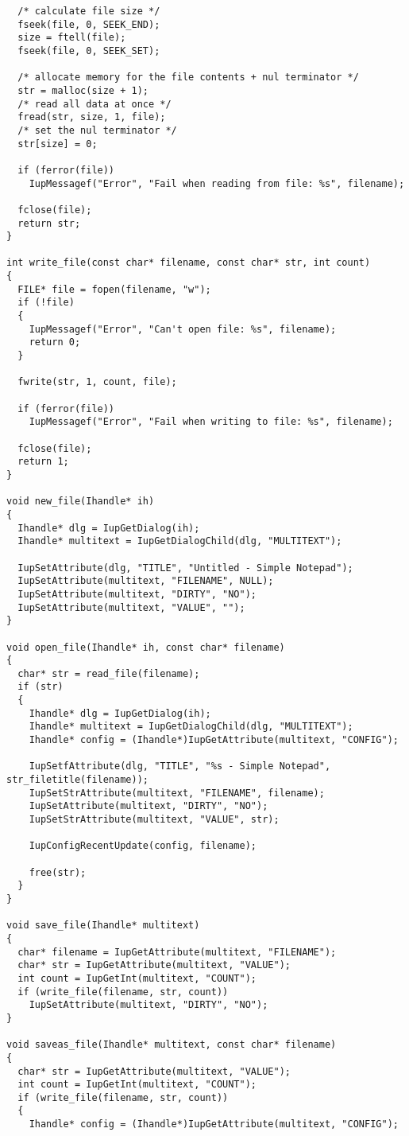 \documentclass{ctexart}
\begin{document}
\begin{lstlisting}
  /* calculate file size */
  fseek(file, 0, SEEK_END);
  size = ftell(file);
  fseek(file, 0, SEEK_SET);

  /* allocate memory for the file contents + nul terminator */
  str = malloc(size + 1);
  /* read all data at once */
  fread(str, size, 1, file);
  /* set the nul terminator */
  str[size] = 0;

  if (ferror(file))
    IupMessagef("Error", "Fail when reading from file: %s", filename);

  fclose(file);
  return str;
}

int write_file(const char* filename, const char* str, int count)
{
  FILE* file = fopen(filename, "w");
  if (!file)
  {
    IupMessagef("Error", "Can't open file: %s", filename);
    return 0;
  }

  fwrite(str, 1, count, file);

  if (ferror(file))
    IupMessagef("Error", "Fail when writing to file: %s", filename);

  fclose(file);
  return 1;
}

void new_file(Ihandle* ih)
{
  Ihandle* dlg = IupGetDialog(ih);
  Ihandle* multitext = IupGetDialogChild(dlg, "MULTITEXT");

  IupSetAttribute(dlg, "TITLE", "Untitled - Simple Notepad");
  IupSetAttribute(multitext, "FILENAME", NULL);
  IupSetAttribute(multitext, "DIRTY", "NO");
  IupSetAttribute(multitext, "VALUE", "");
}

void open_file(Ihandle* ih, const char* filename)
{
  char* str = read_file(filename);
  if (str)
  {
    Ihandle* dlg = IupGetDialog(ih);
    Ihandle* multitext = IupGetDialogChild(dlg, "MULTITEXT");
    Ihandle* config = (Ihandle*)IupGetAttribute(multitext, "CONFIG");

    IupSetfAttribute(dlg, "TITLE", "%s - Simple Notepad", str_filetitle(filename));
    IupSetStrAttribute(multitext, "FILENAME", filename);
    IupSetAttribute(multitext, "DIRTY", "NO");
    IupSetStrAttribute(multitext, "VALUE", str);

    IupConfigRecentUpdate(config, filename);

    free(str);
  }
}

void save_file(Ihandle* multitext)
{
  char* filename = IupGetAttribute(multitext, "FILENAME");
  char* str = IupGetAttribute(multitext, "VALUE");
  int count = IupGetInt(multitext, "COUNT");
  if (write_file(filename, str, count))
    IupSetAttribute(multitext, "DIRTY", "NO");
}

void saveas_file(Ihandle* multitext, const char* filename)
{
  char* str = IupGetAttribute(multitext, "VALUE");
  int count = IupGetInt(multitext, "COUNT");
  if (write_file(filename, str, count))
  {
    Ihandle* config = (Ihandle*)IupGetAttribute(multitext, "CONFIG");
  

\end{lstlisting}
\end{document}
